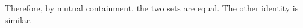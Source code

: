 \documentclass{test}  %
\begin{document}
\begin{problem}
\begin{exes}
\begin{answer}
  Therefore, by mutual containment, the two sets are equal.
  The other identity is similar.  
\end{answer}
\end{exes}


  



\end{problem}
\end{document}
